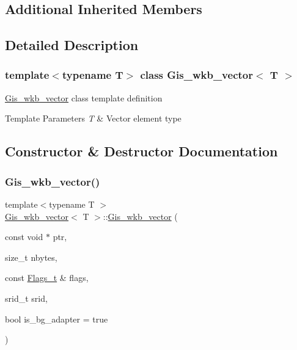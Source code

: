 \subsection*{Additional Inherited Members}


\subsection{Detailed Description}
\subsubsection*{template$<$typename T$>$\newline
class Gis\+\_\+wkb\+\_\+vector$<$ T $>$}

\mbox{\hyperlink{classGis__wkb__vector}{Gis\+\_\+wkb\+\_\+vector}} class template definition 
\begin{DoxyTemplParams}{Template Parameters}
{\em T} & Vector element type \\
\hline
\end{DoxyTemplParams}


\subsection{Constructor \& Destructor Documentation}
\mbox{\label{classGis__wkb__vector_a2438c0e293166b7b4a30e19925a423b1}} 
\subsubsection{\texorpdfstring{Gis\+\_\+wkb\+\_\+vector()}{Gis\_wkb\_vector()}}
{\footnotesize\ttfamily template$<$typename T $>$ \\
\mbox{\hyperlink{classGis__wkb__vector}{Gis\+\_\+wkb\+\_\+vector}}$<$ T $>$\+::\mbox{\hyperlink{classGis__wkb__vector}{Gis\+\_\+wkb\+\_\+vector}} (\begin{DoxyParamCaption}\item[{const void $\ast$}]{ptr,  }\item[{size\+\_\+t}]{nbytes,  }\item[{const \mbox{\hyperlink{classGeometry_1_1Flags__t}{Flags\+\_\+t}} \&}]{flags,  }\item[{srid\+\_\+t}]{srid,  }\item[{bool}]{is\+\_\+bg\+\_\+adapter = {\ttfamily true} }\end{DoxyParamCaption})}




